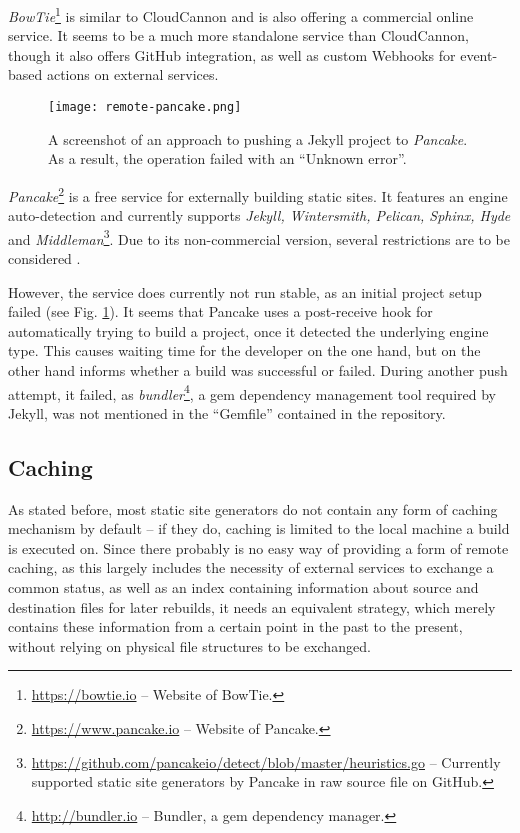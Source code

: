 \emph{BowTie}\footnote{\url{https://bowtie.io} -- Website of BowTie.} is similar to CloudCannon and is also offering a commercial online service. It seems to be a much more standalone service than CloudCannon, though it also offers GitHub integration, as well as custom Webhooks for event-based actions on external services.

\begin{figure} %
    \centering
    \texttt{[image: remote-pancake.png]}
    \caption{A screenshot of an approach to pushing a Jekyll project to \emph{Pancake}. As a result, the operation failed with an ``Unknown error''.}
    \label{fig:remote-pancake}
\end{figure}
%
\emph{Pancake}\footnote{\url{https://www.pancake.io} -- Website of Pancake.} is a free service for externally building static sites. It features an engine auto-detection and currently supports \emph{Jekyll, Wintersmith, Pelican, Sphinx, Hyde} and \emph{Middleman}\footnote{\url{https://github.com/pancakeio/detect/blob/master/heuristics.go} -- Currently supported static site generators by Pancake in raw source file on GitHub.}. Due to its non-commercial version, several restrictions are to be considered \cite{PancakeGitProjects}.

However, the service does currently not run stable, as an initial project setup failed (see Fig. \ref{fig:remote-pancake}). It seems that Pancake uses a post-receive hook for automatically trying to build a project, once it detected the underlying engine type. This causes waiting time for the developer on the one hand, but on the other hand informs whether a build was successful or failed. During another push attempt, it failed, as \emph{bundler}\footnote{\url{http://bundler.io} -- Bundler, a gem dependency manager.}, a gem dependency management tool required by Jekyll, was not mentioned in the ``Gemfile'' contained in the repository.

\subsection{Caching}
\label{sec:solutions-caching}

As stated before, most static site generators do not contain any form of caching mechanism by default -- if they do, caching is limited to the local machine a build is executed on. Since there probably is no easy way of providing a form of remote caching, as this largely includes the necessity of external services to exchange a common status, as well as an index containing information about source and destination files for later rebuilds, it needs an equivalent strategy, which merely contains these information from a certain point in the past to the present, without relying on physical file structures to be exchanged.

